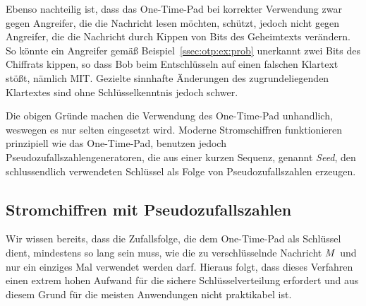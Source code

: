 Ebenso nachteilig ist, dass das One-Time-Pad bei korrekter Verwendung zwar gegen Angreifer, die die Nachricht lesen möchten, schützt, jedoch nicht gegen Angreifer, die die Nachricht durch Kippen von Bits des Geheimtexts verändern. So könnte ein Angreifer gemäß Beispiel~\ref{ssec:otp:ex:prob} unerkannt zwei Bits des Chiffrats kippen, so dass Bob beim Entschlüsseln auf einen falschen Klartext stößt, nämlich MIT. Gezielte sinnhafte Änderungen des zugrundeliegenden Klartextes sind ohne Schlüsselkenntnis jedoch schwer. 

Die obigen Gründe machen die Verwendung des One-Time-Pad unhandlich, weswegen es nur selten eingesetzt wird. Moderne Stromschiffren funktionieren prinzipiell wie das One-Time-Pad, benutzen jedoch Pseudozufallszahlengeneratoren, die aus einer kurzen Sequenz, genannt \emph{Seed}, den schlussendlich verwendeten Schlüssel als Folge von Pseudozufallszahlen erzeugen.

\subsection{Stromchiffren mit Pseudozufallszahlen}
\label{ssec:stromchiffrenpseudozufall}
Wir wissen bereits, dass die Zufallsfolge, die dem One-Time-Pad als Schlüssel dient, mindestens so lang sein muss, wie die zu verschlüsselnde Nachricht $M$ und nur ein einziges Mal verwendet werden darf. Hieraus folgt, dass dieses Verfahren einen extrem hohen Aufwand für die sichere Schlüsselverteilung erfordert und aus diesem Grund für die meisten Anwendungen nicht praktikabel ist.


